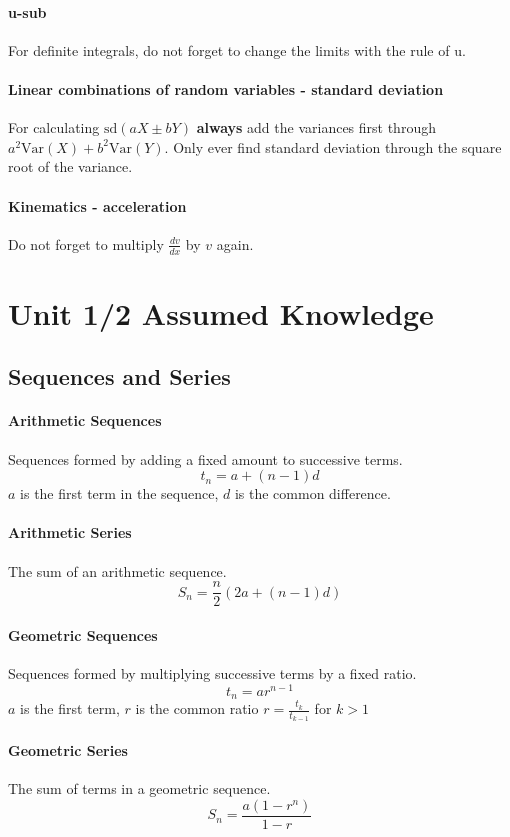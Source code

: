 \documentclass[a4paper,twoside]{article}
\begin{document}
		\paragraph{u-sub} For definite integrals, do not forget to change the limits with the rule of u.
		\paragraph{Linear combinations of random variables - standard deviation} For calculating $\mathrm{sd}(aX\pm bY)$ \textbf{always} add the variances first through $a^2\mathrm{Var}(X)+b^2\mathrm{Var}(Y)$. Only ever find standard deviation through the square root of the variance.
		\paragraph{Kinematics - acceleration} Do not forget to multiply $\frac{dv}{dx}$ by $v$ again.
	\section{Unit 1/2 Assumed Knowledge}
		\subsection{Sequences and Series}
			\paragraph{Arithmetic Sequences} Sequences formed by adding a fixed amount to successive terms.
			\[
				t_n=a+(n-1)d
			\]
			$a$ is the first term in the sequence, $d$ is the common difference.
			
			\paragraph{Arithmetic Series} The sum of an arithmetic sequence.
			\[
				S_n=\frac{n}{2}\left(2a+(n-1)d\right)
			\]
			
			\paragraph{Geometric Sequences} Sequences formed by multiplying successive terms by a fixed ratio.
			\[
				t_n=ar^{n-1}
			\]
			$a$ is the first term, $r$ is the common ratio $r=\frac{t_k}{t_{k-1}}$ for $k>1$
			
			\paragraph{Geometric Series} The sum of terms in a geometric sequence.
			\[
				S_n=\frac{a(1-r^n)}{1-r}
			\]
			
\end{document}
